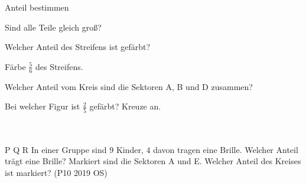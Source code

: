 \setcounter{aufgabe}{9}

\begin{aufgabe}{Anteil bestimmen}
\begin{teile}
\teil Sind alle Teile gleich groß? \janein

\teil Welcher Anteil des Streifens ist gefärbt?

\leerfeld
\teil Färbe $\frac{5}{6}$ des Streifens.

\teil Welcher Anteil vom Kreis sind die Sektoren A, B und D zusammen?

\leerfeld
\teil Bei welcher Figur ist $\frac{2}{5}$ gefärbt? Kreuze an.\\ \\ \\ 

P  \quad Q  \quad R 
\teil In einer Gruppe sind $9$ Kinder, $4$ davon tragen eine Brille. Welcher Anteil trägt eine Brille? \leerfeld
\teil Markiert sind die Sektoren A und E. Welcher Anteil des Kreises ist markiert? \hfill (P10 2019 OS)\\ \\ \\ \\ 

\end{teile}
\end{aufgabe}

